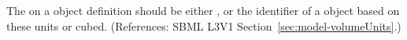 The  on a \Model object definition should be either
,  or the identifier of a \UnitDefinition
object based on these units or  cubed.  (References: SBML L3V1
Section~\ref{sec:model-volumeUnits}.)
